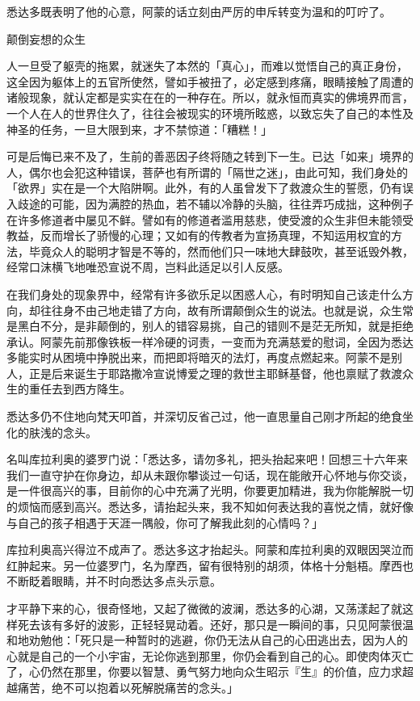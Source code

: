 \documentclass[12pt,twoside,openany]{book}
\begin{document}
悉达多既表明了他的心意，阿蒙的话立刻由严厉的申斥转变为温和的叮咛了。

颠倒妄想的众生

人一旦受了躯壳的拖累，就迷失了本然的「真心」，而难以觉悟自己的真正身份，这全因为躯体上的五官所使然，譬如手被扭了，必定感到疼痛，眼睛接触了周遭的诸般现象，就认定都是实实在在的一种存在。所以，就永恒而真实的佛境界而言，一个人在人的世界住久了，往往会被现实的环境所眩惑，以致忘失了自己的本性及神圣的任务，一旦大限到来，才不禁惊道：「糟糕！」

可是后悔已来不及了，生前的善恶因子终将随之转到下一生。已达「如来」境界的人，偶尔也会犯这种错误，菩萨也有所谓的「隔世之迷」，由此可知，我们身处的「欲界」实在是一个大陷阱啊。此外，有的人虽曾发下了救渡众生的誓愿，仍有误入歧途的可能，因为满腔的热血，若不辅以冷静的头脑，往往弄巧成拙，这种例子在许多修道者中屡见不鲜。譬如有的修道者滥用慈悲，使受渡的众生非但未能领受教益，反而增长了骄慢的心理；又如有的传教者为宣扬真理，不知运用权宜的方法，毕竟众人的聪明才智是不等的，然而他们只一味地大肆鼓吹，甚至诋毁外教，经常口沫横飞地唯恐宣说不周，岂料此适足以引人反感。

在我们身处的现象界中，经常有许多欲乐足以困惑人心，有时明知自己该走什么方向，却往往身不由己地走错了方向，故有所谓颠倒众生的说法。也就是说，众生常是黑白不分，是非颠倒的，别人的错容易挑，自己的错则不是茫无所知，就是拒绝承认。阿蒙先前那像铁板一样冷硬的诃责，一变而为充满慈爱的慰词，全因为悉达多能实时从困境中挣脱出来，而把即将暗灭的法灯，再度点燃起来。阿蒙不是别人，正是后来诞生于耶路撒冷宣说博爱之理的救世主耶稣基督，他也禀赋了救渡众生的重任去到西方降生。

悉达多仍不住地向梵天叩首，并深切反省己过，他一直思量自己刚才所起的绝食坐化的肤浅的念头。

名叫库拉利奥的婆罗门说：「悉达多，请勿多礼，把头抬起来吧！回想三十六年来我们一直守护在你身边，却从未跟你攀谈过一句话，现在能敞开心怀地与你交谈，是一件很高兴的事，目前你的心中充满了光明，你要更加精进，我为你能解脱一切的烦恼而感到高兴。悉达多，请抬起头来，我不知如何表达我的喜悦之情，就好像与自己的孩子相遇于天涯一隅般，你可了解我此刻的心情吗？」

库拉利奥高兴得泣不成声了。悉达多这才抬起头。阿蒙和库拉利奥的双眼因哭泣而红肿起来。另一位婆罗门，名为摩西，留有很特别的胡须，体格十分魁梧。摩西也不断眨着眼睛，并不时向悉达多点头示意。

才平静下来的心，很奇怪地，又起了微微的波澜，悉达多的心湖，又荡漾起了就这样死去该有多好的波影，正轻轻晃动着。还好，那只是一瞬间的事，只见阿蒙很温和地劝勉他：「死只是一种暂时的逃避，你仍无法从自己的心田逃出去，因为人的心就是自己的一个小宇宙，无论你逃到那里，你仍会看到自己的心。即使肉体灭亡了，心仍然在那里，你要以智慧、勇气努力地向众生昭示『生』的价值，应力求超越痛苦，绝不可以抱着以死解脱痛苦的念头。」
\end{document}
